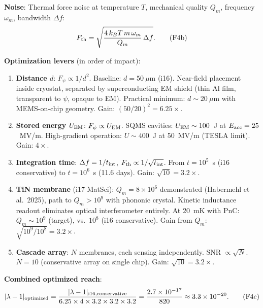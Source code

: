 \documentclass[11pt]{article}
\newcommand{\ee}[1]{\times 10^{#1}}
\newcommand{\lbone}{|\lambda - 1|}
\theoremstyle{definition}
\theoremstyle{remark}
\begin{document}
\begin{tcolorbox}[colback=blue!5!white, colframe=blue!60!black,
  title=\textbf{W4i18 P2: SQMS BOUND REASSESSMENT --- 5 KEY RESULTS}]
\begin{enumerate}
  \textbf{Noise}: Thermal force noise at temperature $T$, mechanical
  quality $Q_m$, frequency $\omega_m$, bandwidth $\Delta f$:
  \begin{equation}
  F_{\rm th} = \sqrt{\frac{4\,k_B T\,m\,\omega_m}{Q_m}\,\Delta f}.
  \tag{F4b}
  \end{equation}

  \textbf{Optimization levers} (in order of impact):
  \begin{enumerate}[nosep]
  \item \textbf{Distance $d$}: $F_\psi \propto 1/d^2$.
    Baseline: $d = 50~\mu$m (i16). Near-field placement inside
    cryostat, separated by superconducting EM shield (thin Al
    film, transparent to $\psi$, opaque to EM). Practical minimum:
    $d \sim 20~\mu$m with MEMS-on-chip geometry. Gain: $(50/20)^2
    = 6.25\times$.

  \item \textbf{Stored energy $U_{\rm EM}$}: $F_\psi \propto U_{\rm EM}$.
    SQMS cavities: $U_{\rm EM} \sim 100$~J at $E_{\rm acc} = 25$~MV/m.
    High-gradient operation: $U \sim 400$~J at 50~MV/m (TESLA limit).
    Gain: $4\times$.

  \item \textbf{Integration time}: $\Delta f = 1/t_{\rm int}$,
    $F_{\rm th} \propto 1/\sqrt{t_{\rm int}}$. From $t = 10^5$~s
    (i16 conservative) to $t = 10^6$~s (11.6 days). Gain: $\sqrt{10}
    = 3.2\times$.

  \item \textbf{TiN membrane} (i17 MatSci): $Q_m = 8\ee{6}$
    demonstrated (Habermehl et al.\ 2025), path to $Q_m > 10^9$
    with phononic crystal. Kinetic inductance readout eliminates
    optical interferometer entirely. At 20~mK with PnC:
    $Q_m \sim 10^9$ (target), vs.\ $10^8$ (i16 conservative).
    Gain from $Q_m$: $\sqrt{10^9/10^8} = 3.2\times$.

  \item \textbf{Cascade array}: $N$ membranes, each sensing
    independently. SNR $\propto \sqrt{N}$. $N = 10$ (conservative
    array on single chip). Gain: $\sqrt{10} = 3.2\times$.
  \end{enumerate}

  \textbf{Combined optimized reach}:
  \begin{equation}
  \lbone_{\rm optimized} = \frac{\lbone_{\rm i16,conservative}}
  {6.25 \times 4 \times 3.2 \times 3.2 \times 3.2}
  = \frac{2.7\ee{-17}}{820} \approx 3.3\ee{-20}.
  \tag{F4c}
  \end{equation}


\end{enumerate}
\end{tcolorbox}
\end{document}
